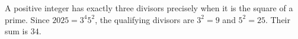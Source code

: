 A positive integer has exactly three divisors precisely when it is the square of a prime. Since $2025=3^4 5^2$, the qualifying divisors are $3^2=9$ and $5^2=25$. Their sum is $\boxed{34}$.
